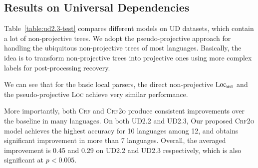 \subsection{Results on Universal Dependencies}

Table~\ref{table:ud2.3-test}
compares different models on UD datasets, which contain a lot of non-projective trees.
We adopt the pseudo-projective approach \cite{nivre-nilsson-2005-pseudo} for handling the ubiquitous non-projective trees of most languages. %
Basically, the idea is to transform non-projective trees into projective ones using more complex labels for post-processing recovery.

% 



We can see that for the basic local parsers,
the direct non-projective $\textsc{Loc}_{\textsc{mst}}$ and the pseudo-projective \textsc{Loc}
achieve very similar performance.

More importantly, both \textsc{Crf} and \textsc{Crf2o} produce consistent improvements over the baseline in many languages.
On both UD2.2 and UD2.3, Our proposed \textsc{Crf2o} model achieves the highest accuracy for 10 languages among 12, and obtains significant improvement in more than 7 languages.
Overall, the averaged improvement is 0.45 and 0.29 on UD2.2 and UD2.3 respectively, which is also significant at $p<0.005$.

